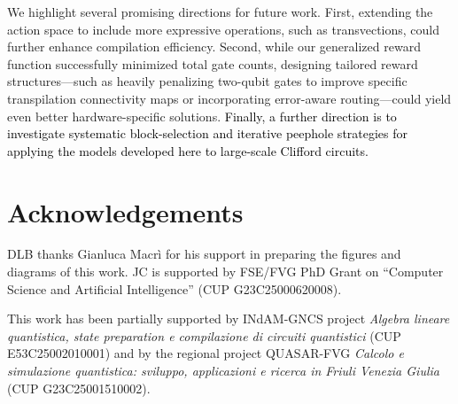 \documentclass[conference]{IEEEtran}
\newcommand{\nt}[1]{\textcolor{black}{#1}}
\begin{document}
We highlight several promising directions for future work. First, extending the action space to include more expressive operations, such as transvections, could further enhance compilation efficiency. Second, while our generalized reward function successfully minimized total gate counts, designing tailored reward structures—such as heavily penalizing two-qubit gates to improve specific transpilation connectivity maps or incorporating error-aware routing—could yield even better hardware-specific solutions. \nt{Finally, a further direction is to investigate systematic block-selection and iterative peephole strategies for applying the models developed here to large-scale Clifford circuits.}

\section{Acknowledgements}
DLB thanks Gianluca Macrì for his support in preparing the figures and diagrams of this work. 
    JC is supported by FSE/FVG PhD Grant on ``Computer Science and Artificial Intelligence'' (CUP G23C25000620008).

    This work has been partially supported by INdAM-GNCS project \emph{Algebra lineare quantistica, state preparation e compilazione di circuiti quantistici} (CUP E53C25002010001) and by the regional project QUASAR-FVG \emph{Calcolo e simulazione quantistica: sviluppo, applicazioni e ricerca in Friuli Venezia Giulia} (CUP G23C25001510002).



\end{document}
